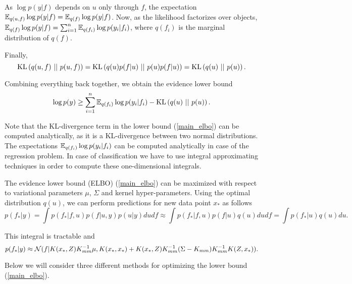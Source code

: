 As $\log p(y|f)$ depends on $u$ only through $f$, the expectation $\mathbb{E}_{q(u, f)}\log p(y | f) = \mathbb{E}_{q(f)}\log p(y | f)$. Now, as the likelihood factorizes over objects, $\mathbb{E}_{q(f)}\log p(y | f) = \sum_{i = 1}^{n} \mathbb{E}_{q(f_i)}\log p(y_i | f_i)$, where $q(f_i)$ is the marginal distribution of $q(f)$.

Finally, 
$$\mbox{KL}\left(q(u, f)\mbox{ || }p(u, f)\right) = \mbox{KL}\left(q(u) p(f | u)\mbox{ || }p(u) p(f | u)\right) = \mbox{KL}\left(q(u)\mbox{ || }p(u)\right).$$

Combining everything back together, we obtain the evidence lower bound
\begin{equation}
	\label{main_elbo}
	\log p(y) \ge \sum_{i = 1}^{n} \mathbb{E}_{q(f_i)} \log p(y_i | f_i) - \mbox{KL}\left(q(u)\mbox{ || }p(u)\right).
\end{equation}

Note that the KL-divergence term in the lower bound (\ref{main_elbo}) can be computed analytically, as it is a KL-divergence between two normal distributions. The expectations $\mathbb{E}_{q(f_i)} \log p(y_i | f_i)$ can be computed analytically in case of the regression problem. In case of classification we have to use integral approximating techniques in order to compute these one-dimensional integrals.

The evidence lower bound (ELBO) (\ref{main_elbo}) can be maximized with respect to variational parameters $\mu$, $\Sigma$ and kernel hyper-parameters. Using the optimal distribution $q(u)$, we can perform predictions for new data point $x_*$ as follows
$$p(f_* | y) = \int p(f_* | f, u) p(f| u, y) p(u | y) du df \approx \int p(f_* | f, u) p(f| u) q(u) du df = \int p(f_* | u) q(u) du.$$

This integral is tractable and
$$p(f_* | y) \approx \mathcal{N}(f| K(x_*, Z) K_{mm}^{-1} \mu, K(x_*, x_*) + K(x_*, Z) K_{mm}^{-1}(\Sigma - K_{mm}) K_{mm}^{-1} K(Z, x_*)).$$

Below we will consider three different methods for optimizing the lower bound (\ref{main_elbo}).

